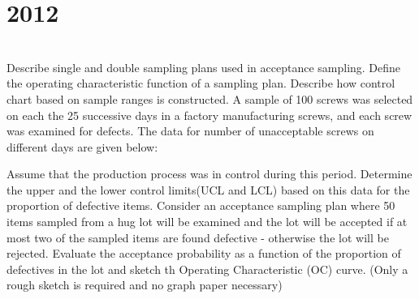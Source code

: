 \section*{2012}
\vspace{-.5cm}
\hrulefill \smallskip\\
 Describe single and double sampling plans used in acceptance sampling. Define the operating characteristic function of a sampling plan.
\myline
{} Describe how control chart based on sample ranges is constructed.
\myline
{} A sample of 100 screws was selected on each the 25 successive days in a factory manufacturing screws, and each screw was examined for defects. The data for number of unacceptable screws on different days are given below:
\begin{center}
\end{center}
Assume that the production process was in control during this period. Determine the upper and the lower control limits(UCL and LCL) based on this data for the proportion of defective items.
\myline
{} Consider an acceptance sampling plan where 50 items sampled from a hug lot will be examined and the lot will be accepted if at most two of the sampled items are found defective - otherwise the lot will be rejected. Evaluate the acceptance probability as a function of the proportion of defectives in the lot and sketch th Operating Characteristic (OC) curve. (Only a rough sketch is required and no graph paper necessary)




